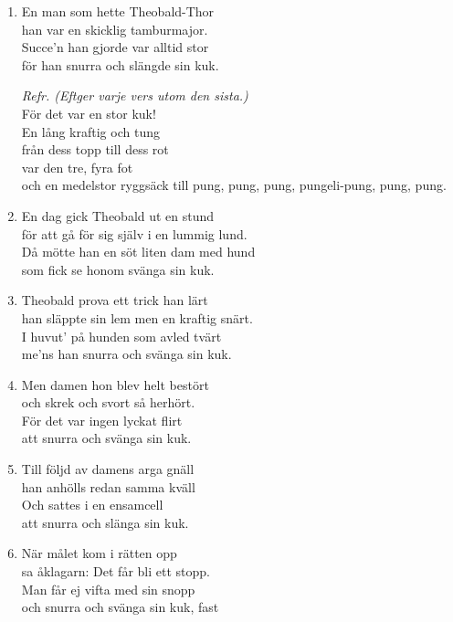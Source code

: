 \documentclass[twoside, openright]{report}
\begin{document}
\begin{enumerate}
\item En man som hette Theobald-Thor\\
han var en skicklig tamburmajor.\\
Succe'n han gjorde var alltid stor\\
för han snurra och slängde sin kuk.

\textit{Refr. (Eftger varje vers utom den sista.)}\\
För det var en stor kuk!\\
En lång kraftig och tung\\
från dess topp till dess rot\\
var den tre, fyra fot\\
och en medelstor ryggsäck till pung, pung, pung, pungeli-pung, pung, pung.\\

\item En dag gick Theobald ut en stund\\
för att gå för sig själv i en lummig lund.\\
Då mötte han en söt liten dam med hund\\
som fick se honom svänga sin kuk.

\item Theobald prova ett trick han lärt\\
han släppte sin lem men en kraftig snärt.\\
I huvut' på hunden som avled tvärt\\
me'ns han snurra och svänga sin kuk.

\item Men damen hon blev helt bestört\\
och skrek och svort så herhört.\\
För det var ingen lyckat flirt\\
att snurra och svänga sin kuk.

\item Till följd av damens arga gnäll\\
han anhölls redan samma kväll\\
Och sattes i en ensamcell\\
att snurra och slänga sin kuk.

\item När målet kom i rätten opp\\
sa åklagarn: Det får bli ett stopp.\\
Man får ej vifta med sin snopp\\
och snurra och svänga sin kuk, fast


\end{enumerate}
\end{document}
